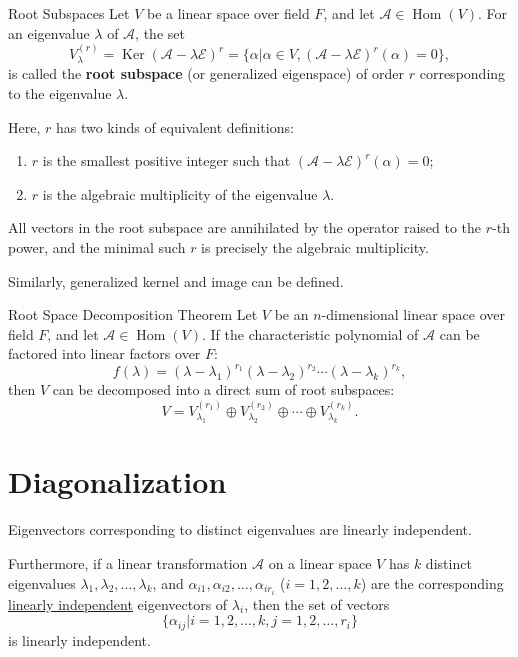 \documentclass[11pt]{../../TexTemplate/elegantbook} %
\begin{document}
\begin{definition}{Root Subspaces}
    Let \( V \) be a linear space over field \( F \), 
    and let \( \mathcal{A}\in \operatorname{Hom}(V) \).
    For an eigenvalue \( \lambda \) of \( \mathcal{A} \),
    the set
    \[
    V_{\lambda}^{(r)} = \operatorname{Ker}(\mathcal{A} - \lambda \mathcal{E})^{r} = 
    \{ \alpha | \alpha \in V, (\mathcal{A} - \lambda \mathcal{E})^{r}(\alpha) = 0 \},
    \]
    is called the \textbf{root subspace} (or generalized eigenspace) of order \( r \)
    corresponding to the eigenvalue \( \lambda \).
\end{definition}
\begin{remark}
    Here, \(r\) has two kinds of equivalent definitions:
    \begin{enumerate}
        \item \(r\) is the smallest positive integer such that 
            \((\mathcal{A} - \lambda \mathcal{E})^{r}(\alpha) = 0\);
        \item \(r\) is the algebraic multiplicity of the eigenvalue \( \lambda \).
    \end{enumerate}
    All vectors in the root subspace are annihilated by the operator raised to the \(r\)-th power, 
    and the minimal such \(r\) is precisely the algebraic multiplicity.
\end{remark}
Similarly, generalized kernel and image can be defined.

\vspace{0.7cm}

\begin{theorem}{Root Space Decomposition Theorem}\label{theorem:space_decomposition}
    Let \( V \) be an \( n \)-dimensional linear space over field \( F \), 
    and let \( \mathcal{A}\in \operatorname{Hom}(V) \).
    If the characteristic polynomial of \( \mathcal{A} \) can be factored into linear factors over \( F \):
    \[
    f(\lambda) = ( \lambda - \lambda_1)^{r_1} ( \lambda - \lambda_2)^{r_2} \cdots ( \lambda - \lambda_k)^{r_k},
    \]
    then \(V\) can be decomposed into a direct sum of root subspaces:
    \[
    V = V_{\lambda_1}^{(r_1)} \oplus V_{\lambda_2}^{(r_2)} \oplus \cdots \oplus V_{\lambda_k}^{(r_k)}.
    \]
\end{theorem}





\section{Diagonalization}
\begin{lemma}
    Eigenvectors corresponding to distinct eigenvalues are linearly independent.

    Furthermore, if a linear transformation \( \mathcal{A} \) on a linear space \( V \)
    has \( k \) distinct eigenvalues \( \lambda_1, \lambda_2, \dots, \lambda_k \),
    and \( \alpha_{i1}, \alpha_{i2}, \dots, \alpha_{ir_{i}} \) (\(i = 1, 2, \dots, k\)) 
    are the corresponding \underline{linearly independent} eigenvectors of \( \lambda_i \),
    then the set of vectors
    \[
    \{ \alpha_{ij} | i = 1, 2, \dots, k, j = 1, 2, \dots, r_i \}
    \]
    is linearly independent.
\end{lemma}
\end{document}
